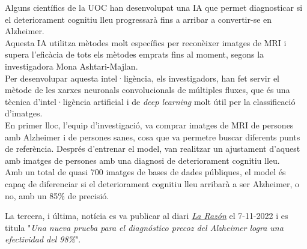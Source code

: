 \documentclass[a4paper,12pt]{article}
\begin{document}
\begin{center}
    \begin{minipage}{0.9\linewidth}
        \vspace{5pt}
        {\small
            Alguns científics de la UOC han desenvolupat una IA que permet diagnosticar si el deteriorament cognitiu lleu progressarà fins a arribar a convertir-se en Alzheimer.\\
            Aquesta IA utilitza mètodes molt específics per reconèixer imatges de MRI i supera l'eficàcia de tots els mètodes emprats fins al moment, segons la investigadora Mona Ashtari-Majlan.\\
            Per desenvolupar aquesta intel·ligència, els investigadors, han fet servir el mètode de les xarxes neuronals convolucionals de múltiples fluxes, que és una tècnica d'intel·ligència artificial i de \textit{deep learning} molt útil per la classificació d'imatges.\\
            En primer lloc, l'equip d'investigació, va comprar imatges de MRI de persones amb Alzheimer i de persones sanes, cosa que va permetre buscar diferents punts de referència. Després d'entrenar el model, van realitzar un ajustament d'aquest amb imatges de persones amb una diagnosi de deteriorament cognitiu lleu.\\
            Amb un total de quasi 700 imatges de bases de dades públiques, el model és capaç de diferenciar si el deteriorament cognitiu lleu arribarà a ser Alzheimer, o no, amb un 85\% de precisió.
        }
        \vspace{5pt}
    \end{minipage}
\end{center}
\newpage
La tercera, i última, notícia es va publicar al diari \href{https://www.larazon.es/sociedad/20220620/ajwe2fywxzgnta7zt4godk4bae.html}{\underline{\textit{La Razón}}} el 7-11-2022 i es titula "\textit{Una nueva prueba para el diagnóstico precoz del Alzheimer logra una efectividad del 98\%}".
\end{document}
